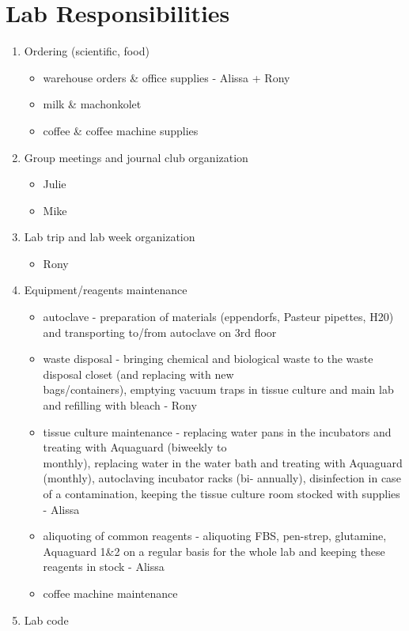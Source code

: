 \documentclass[]{book}
\providecommand{\tightlist}{%
  \setlength{\itemsep}{0pt}\setlength{\parskip}{0pt}}
\begin{document}
\chapter{Lab Responsibilities}\label{labResponsibilities}

\begin{enumerate}
\def\labelenumi{\arabic{enumi}.}
\item
  Ordering (scientific, food)

  \begin{itemize}
  \tightlist
  \item
    warehouse orders \& office supplies - Alissa + Rony
  \item
    milk \& machonkolet
  \item
    coffee \& coffee machine supplies
  \end{itemize}
\item
  Group meetings and journal club organization

  \begin{itemize}
  \tightlist
  \item
    Julie
  \item
    Mike
  \end{itemize}
\item
  Lab trip and lab week organization

  \begin{itemize}
  \tightlist
  \item
    Rony
  \end{itemize}
\item
  Equipment/reagents maintenance

  \begin{itemize}
  \tightlist
  \item
    autoclave - preparation of materials (eppendorfs, Pasteur pipettes,
    H20) and transporting to/from autoclave on 3rd floor
  \item
    waste disposal - bringing chemical and biological waste to the waste
    disposal closet (and replacing with new\\
    bags/containers), emptying vacuum traps in tissue culture and main
    lab and refilling with bleach - Rony
  \item
    tissue culture maintenance - replacing water pans in the incubators
    and treating with Aquaguard (biweekly to\\
    monthly), replacing water in the water bath and treating with
    Aquaguard (monthly), autoclaving incubator racks (bi- annually),
    disinfection in case of a contamination, keeping the tissue culture
    room stocked with supplies - Alissa
  \item
    aliquoting of common reagents - aliquoting FBS, pen-strep,
    glutamine, Aquaguard 1\&2 on a regular basis for the whole lab and
    keeping these reagents in stock - Alissa
  \item
    coffee machine maintenance
  \end{itemize}
\item
  Lab code


\end{enumerate}
\end{document}
